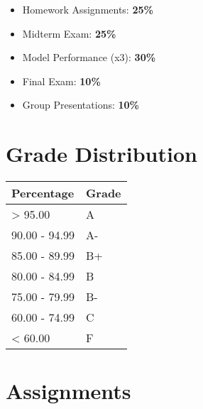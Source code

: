 \documentclass[11pt,]{article}
\providecommand{\tightlist}{%
  \setlength{\itemsep}{0pt}\setlength{\parskip}{0pt}}
\begin{document}
\begin{itemize}
\tightlist
\item
  Homework Assignments: \textbf{25\%}
\item
  Midterm Exam: \textbf{25\%}
\item
  Model Performance (x3): \textbf{30\%}
\item
  Final Exam: \textbf{10\%}
\item
  Group Presentations: \textbf{10\%}
\end{itemize}

\hypertarget{grade-distribution}{%
\section{Grade Distribution}\label{grade-distribution}}

\begin{longtable}[]{@{}ll@{}}
\toprule
Percentage & Grade\tabularnewline
\midrule
\endhead
\textgreater{} 95.00 & A\tabularnewline
90.00 - 94.99 & A-\tabularnewline
85.00 - 89.99 & B+\tabularnewline
80.00 - 84.99 & B\tabularnewline
75.00 - 79.99 & B-\tabularnewline
60.00 - 74.99 & C\tabularnewline
\textless{} 60.00 & F\tabularnewline
\bottomrule
\end{longtable}

\hypertarget{assignments}{%
\section{Assignments}\label{assignments}}
\end{document}
